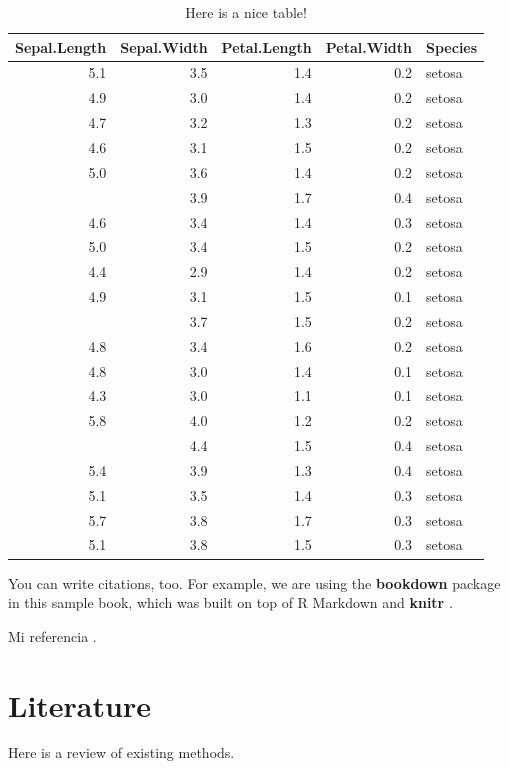 \documentclass[
]{book}
\theoremstyle{definition}
\theoremstyle{definition}
\theoremstyle{definition}
\theoremstyle{definition}
\theoremstyle{remark}
\begin{document}
\begin{table}

\caption{\label{tab:nice-tab}Here is a nice table!}
\centering
\begin{tabular}[t]{rrrrl}
\toprule
Sepal.Length & Sepal.Width & Petal.Length & Petal.Width & Species\\
\midrule
5.1 & 3.5 & 1.4 & 0.2 & setosa\\
4.9 & 3.0 & 1.4 & 0.2 & setosa\\
4.7 & 3.2 & 1.3 & 0.2 & setosa\\
4.6 & 3.1 & 1.5 & 0.2 & setosa\\
5.0 & 3.6 & 1.4 & 0.2 & setosa\\
\addlinespace
5.4 & 3.9 & 1.7 & 0.4 & setosa\\
4.6 & 3.4 & 1.4 & 0.3 & setosa\\
5.0 & 3.4 & 1.5 & 0.2 & setosa\\
4.4 & 2.9 & 1.4 & 0.2 & setosa\\
4.9 & 3.1 & 1.5 & 0.1 & setosa\\
\addlinespace
5.4 & 3.7 & 1.5 & 0.2 & setosa\\
4.8 & 3.4 & 1.6 & 0.2 & setosa\\
4.8 & 3.0 & 1.4 & 0.1 & setosa\\
4.3 & 3.0 & 1.1 & 0.1 & setosa\\
5.8 & 4.0 & 1.2 & 0.2 & setosa\\
\addlinespace
5.7 & 4.4 & 1.5 & 0.4 & setosa\\
5.4 & 3.9 & 1.3 & 0.4 & setosa\\
5.1 & 3.5 & 1.4 & 0.3 & setosa\\
5.7 & 3.8 & 1.7 & 0.3 & setosa\\
5.1 & 3.8 & 1.5 & 0.3 & setosa\\
\bottomrule
\end{tabular}
\end{table}

You can write citations, too. For example, we are using the \textbf{bookdown} package \citep{R-bookdown} in this sample book, which was built on top of R Markdown and \textbf{knitr} \citep{xie2015}.

Mi referencia \citep{blitzstein2019}.

\hypertarget{literature}{%
\chapter{Literature}\label{literature}}

Here is a review of existing methods.
\end{document}
